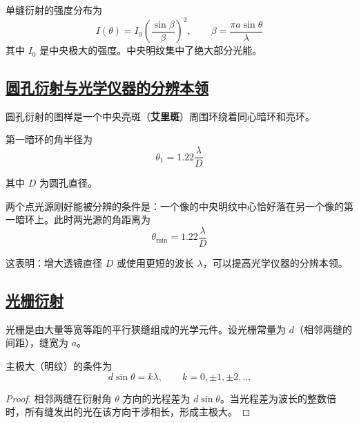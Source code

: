 \begin{remark}
    单缝衍射的强度分布为
    \begin{equation}
        I(\theta) = I_0 \left(\frac{\sin\beta}{\beta}\right)^2, \qquad \beta = \frac{\pi a\sin\theta}{\lambda}
    \end{equation}
    其中 $I_0$ 是中央极大的强度。中央明纹集中了绝大部分光能。
\end{remark}

\subsection{\protect\hyperlink{:}{圆孔衍射与光学仪器的分辨本领}}

圆孔衍射的图样是一个中央亮斑（\textbf{艾里斑}）周围环绕着同心暗环和亮环。

第一暗环的角半径为
\begin{equation}
    \theta_1 = 1.22\frac{\lambda}{D}
\end{equation}

其中 $D$ 为圆孔直径。

\begin{theorem}[瑞利判据]
    两个点光源刚好能被分辨的条件是：一个像的中央明纹中心恰好落在另一个像的第一暗环上。此时两光源的角距离为
    \begin{equation}
        \theta_{\min} = 1.22\frac{\lambda}{D}
    \end{equation}
\end{theorem}

这表明：增大透镜直径 $D$ 或使用更短的波长 $\lambda$，可以提高光学仪器的分辨本领。

\subsection{\protect\hyperlink{:}{光栅衍射}}

光栅是由大量等宽等距的平行狭缝组成的光学元件。设光栅常量为 $d$（相邻两缝的间距），缝宽为 $a$。

\begin{theorem}[光栅方程]
    主极大（明纹）的条件为
    \begin{equation}
        d\sin\theta = k\lambda, \qquad k = 0, \pm1, \pm2, \ldots
    \end{equation}
\end{theorem}

\begin{proof}
    相邻两缝在衍射角 $\theta$ 方向的光程差为 $d\sin\theta$。当光程差为波长的整数倍时，所有缝发出的光在该方向干涉相长，形成主极大。
\end{proof}

